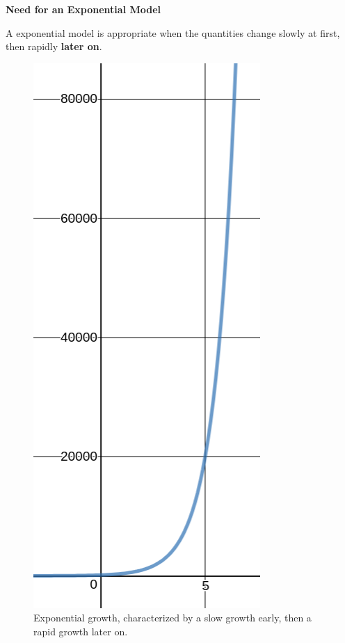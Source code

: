 \documentclass{ximera}
\begin{document}
\begin{theorem}
	\textbf{Need for an Exponential Model}
	
	A exponential model is appropriate when the quantities change slowly at first, then rapidly \textbf{later on}. 
	
	\begin{figure}
		\includegraphics[scale=0.3]{expGrowth.png}
		\caption{Exponential growth, characterized by a slow growth early, then a rapid growth later on.}
	\end{figure}
	

\end{theorem}
\end{document}
